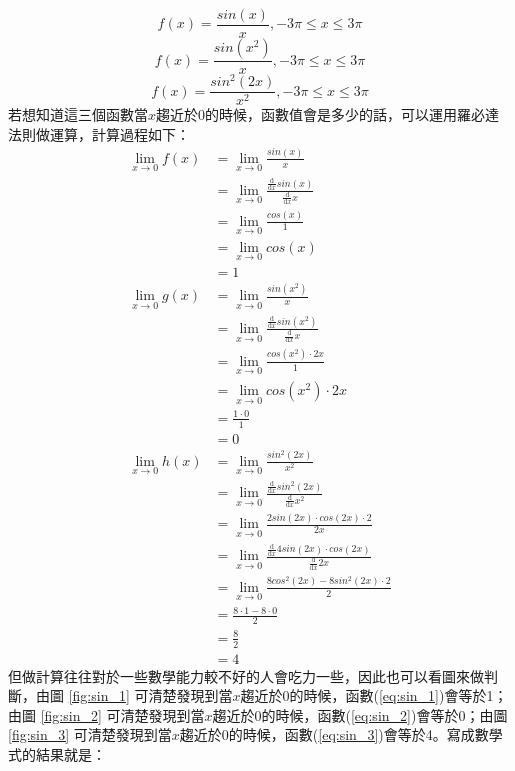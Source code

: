 \documentclass[12pt, a4paper]{article}
\begin{document}
\begin{equation}\label{eq:sin_1}
f(x)=\frac{sin(x)}{x},-3\pi\leq x\leq 3\pi
\end{equation}
\begin{equation}\label{eq:sin_2}
f(x)=\frac{sin(x^2)}{x},-3\pi\leq x\leq 3\pi
\end{equation}
\begin{equation}\label{eq:sin_3}
f(x)=\frac{sin^2(2x)}{x^2},-3\pi\leq x\leq 3\pi
\end{equation}
若想知道這三個函數當$x$趨近於0的時候，函數值會是多少的話，可以運用羅必達法則做運算，計算過程如下：
\begin{align*}
\lim_{x \rightarrow 0}f(x)&=\lim_{x \rightarrow 0}\frac{sin(x)}{x}\\
&=\lim_{x \rightarrow 0}\frac{\frac{\text{d}}{\text{d}x}sin(x)}{\frac{\text{d}}{\text{d}x}x}\\
&=\lim_{x \rightarrow 0}\frac{cos(x)}{1}\\
&=\lim_{x \rightarrow 0}cos(x)\\
&=1\\
\lim_{x \rightarrow 0}g(x)&=\lim_{x \rightarrow 0}\frac{sin(x^2)}{x}\\
&=\lim_{x \rightarrow 0}\frac{\frac{\text{d}}{\text{d}x}sin(x^2)}{\frac{\text{d}}{\text{d}x}x}\\
&=\lim_{x \rightarrow 0}\frac{cos(x^2)\cdot2x}{1}\\
&=\lim_{x \rightarrow 0}cos(x^2)\cdot2x\\
&=\frac{1\cdot0}{1}\\
&=0\\
\lim_{x \rightarrow 0}h(x)&=\lim_{x \rightarrow 0}\frac{sin^2(2x)}{x^2}\\
&=\lim_{x \rightarrow 0}\frac{\frac{\text{d}}{\text{d}x}sin^2(2x)}{\frac{\text{d}}{\text{d}x}x^2}\\
&=\lim_{x \rightarrow 0}\frac{2sin(2x)\cdot cos(2x)\cdot2}{2x}\\
&=\lim_{x \rightarrow 0}\frac{\frac{\text{d}}{\text{d}x}4sin(2x)\cdot cos(2x)}{\frac{\text{d}}{\text{d}x}2x}\\
&=\lim_{x \rightarrow 0}\frac{8cos^2(2x)-8sin^2(2x)\cdot2}{2}\\
&=\frac{8\cdot1-8\cdot0}{2}\\
&=\frac{8}{2}\\
&=4
\end{align*}
但做計算往往對於一些數學能力較不好的人會吃力一些，因此也可以看圖來做判斷，由圖 \ref{fig:sin_1} 可清楚發現到當$x$趨近於0的時候，函數(\ref{eq:sin_1})會等於1；由圖 \ref{fig:sin_2} 可清楚發現到當$x$趨近於0的時候，函數(\ref{eq:sin_2})會等於0；由圖 \ref{fig:sin_3} 可清楚發現到當$x$趨近於0的時候，函數(\ref{eq:sin_3})會等於4。寫成數學式的結果就是：
\end{document}
